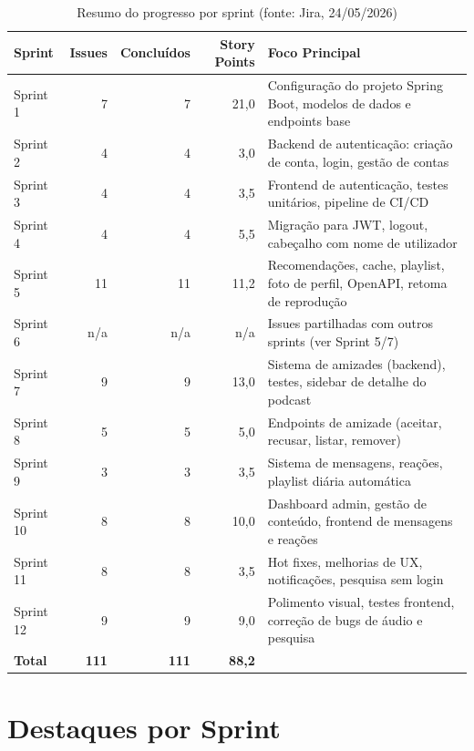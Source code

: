 \documentclass[12pt, a4paper]{report}
\begin{document}
\begin{table}[H]
  \centering
  \begin{tabular}{L{2.5cm} r r r L{6cm}}
    \toprule
    \textbf{Sprint} & \textbf{Issues} & \textbf{Concluídos} & \textbf{Story Points} & \textbf{Foco Principal} \\
    \midrule
    Sprint 1  & 7  & 7  & 21,0 & Configuração do projeto Spring Boot, modelos de dados e endpoints base \\
    Sprint 2  & 4  & 4  & 3,0  & Backend de autenticação: criação de conta, login, gestão de contas \\
    Sprint 3  & 4  & 4  & 3,5  & Frontend de autenticação, testes unitários, pipeline de CI/CD \\
    Sprint 4  & 4  & 4  & 5,5  & Migração para JWT, logout, cabeçalho com nome de utilizador \\
    Sprint 5  & 11 & 11 & 11,2 & Recomendações, cache, playlist, foto de perfil, OpenAPI, retoma de reprodução \\
    Sprint 6  & n/a & n/a & n/a  & Issues partilhadas com outros sprints (ver Sprint 5/7) \\
    Sprint 7  & 9  & 9  & 13,0 & Sistema de amizades (backend), testes, sidebar de detalhe do podcast \\
    Sprint 8  & 5  & 5  & 5,0  & Endpoints de amizade (aceitar, recusar, listar, remover) \\
    Sprint 9  & 3  & 3  & 3,5  & Sistema de mensagens, reações, playlist diária automática \\
    Sprint 10 & 8  & 8  & 10,0 & Dashboard admin, gestão de conteúdo, frontend de mensagens e reações \\
    Sprint 11 & 8  & 8  & 3,5  & Hot fixes, melhorias de UX, notificações, pesquisa sem login \\
    Sprint 12 & 9  & 9  & 9,0  & Polimento visual, testes frontend, correção de bugs de áudio e pesquisa \\
    \midrule
    \textbf{Total} & \textbf{111} & \textbf{111} & \textbf{88,2} & \\
    \bottomrule
  \end{tabular}
  \caption{Resumo do progresso por sprint (fonte: Jira, 24/05/2026)}
\end{table}

\section{Destaques por Sprint}
\end{document}
